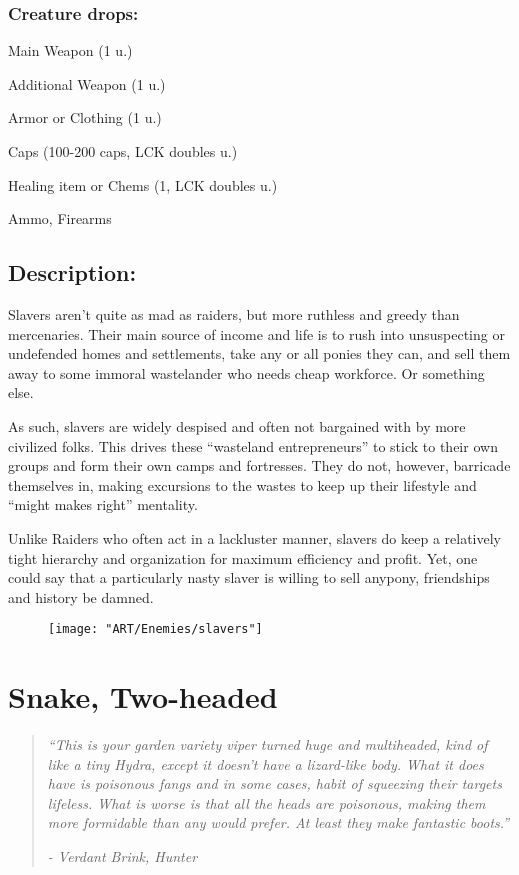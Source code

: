 \documentclass[11pt,a4paper,twocolumn]{book}
\begin{document}
	\subsubsection*{Creature drops:}
	\begin{compactitem}
		\item Main Weapon (1 u.)
		\item Additional Weapon (1 u.)
		\item Armor or Clothing (1 u.)
		\item Caps (100-200 caps, LCK doubles u.)
		\item Healing item or Chems (1, LCK doubles u.)
		\item Ammo, Firearms
	\end{compactitem}
	
	\subsection*{Description:}
	Slavers aren't quite as mad as raiders, but more ruthless and greedy than mercenaries. Their main source of income and life is to rush into unsuspecting or undefended homes and settlements, take any or all ponies they can, and sell them away to some immoral wastelander who needs cheap workforce. Or something else.
	
	As such, slavers are widely despised and often not bargained with by more civilized folks. This drives these ``wasteland entrepreneurs'' to stick to their own groups and form their own camps and fortresses. They do not, however, barricade themselves in, making excursions to the wastes to keep up their lifestyle and ``might makes right'' mentality.
	
	Unlike Raiders who often act in a lackluster manner, slavers do keep a relatively tight hierarchy and organization for maximum efficiency and profit. Yet, one could say that a particularly nasty slaver is willing to sell anypony, friendships and history be damned.
	
	\begin{figure}[h]
		\centering
		\texttt{[image: "ART/Enemies/slavers"]}
	\end{figure}
	
	\clearpage
	
	\section*{Snake, Two-headed}
	\begin{quote}
		\emph{``This is your garden variety viper turned huge and multiheaded, kind of like a tiny Hydra, except it doesn't have a lizard-like body. What it does have is poisonous fangs and in some cases, habit of squeezing their targets lifeless. What is worse is that all the heads are poisonous, making them more formidable than any would prefer. At least they make fantastic boots.''}
		
		\emph{-	Verdant Brink, Hunter}
	\end{quote}
	
\end{document}
